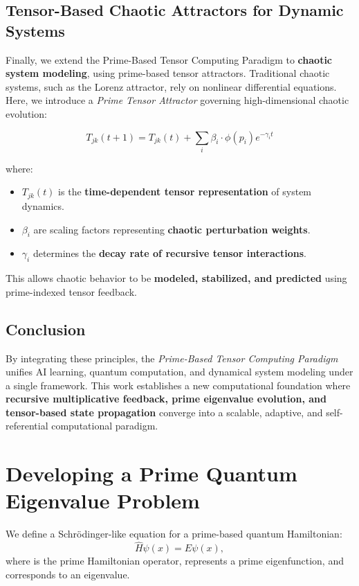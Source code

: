 \documentclass{article}
\theoremstyle{plain}
\theoremstyle{plain}
\theoremstyle{definition}
\theoremstyle{remark}
\begin{document}
\subsection{Tensor-Based Chaotic Attractors for Dynamic Systems}

Finally, we extend the Prime-Based Tensor Computing Paradigm to \textbf{chaotic system modeling}, using prime-based tensor attractors. Traditional chaotic systems, such as the Lorenz attractor, rely on nonlinear differential equations. Here, we introduce a \textit{Prime Tensor Attractor} governing high-dimensional chaotic evolution:

\begin{equation}
T_{jk}(t+1) = T_{jk}(t) + \sum_{i} \beta_i \cdot \phi(p_i) e^{- \gamma_i t}
\end{equation}

where:
\begin{itemize}
    \item $T_{jk}(t)$ is the \textbf{time-dependent tensor representation} of system dynamics.
    \item $\beta_i$ are scaling factors representing \textbf{chaotic perturbation weights}.
    \item $\gamma_i$ determines the \textbf{decay rate of recursive tensor interactions}.
\end{itemize}

This allows chaotic behavior to be \textbf{modeled, stabilized, and predicted} using prime-indexed tensor feedback.

\subsection{Conclusion}

By integrating these principles, the \textit{Prime-Based Tensor Computing Paradigm} unifies AI learning, quantum computation, and dynamical system modeling under a single framework. This work establishes a new computational foundation where \textbf{recursive multiplicative feedback, prime eigenvalue evolution, and tensor-based state propagation} converge into a scalable, adaptive, and self-referential computational paradigm.

\section{Developing a Prime Quantum Eigenvalue Problem}
We define a Schrödinger-like equation for a prime-based quantum Hamiltonian:
\begin{equation}
\hat{H} \psi(x) = E \psi(x),
\end{equation}
where  is the prime Hamiltonian operator,  represents a prime eigenfunction, and  corresponds to an eigenvalue.
\end{document}
